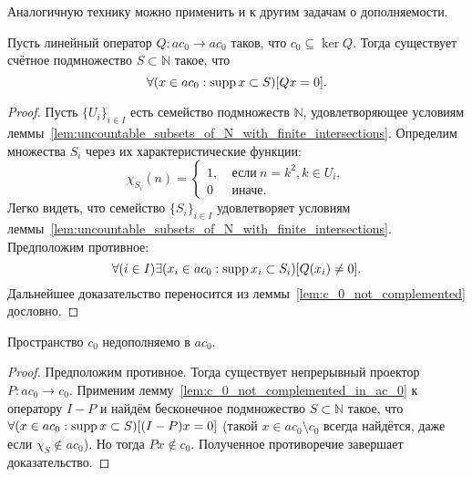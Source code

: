 Аналогичную технику можно применить и к другим задачам о дополняемости.




\begin{lemma}
	\label{lem:c_0_not_complemented_in_ac_0}
	Пусть линейный оператор $Q: ac_0 \to ac_0$ таков, что $c_0\subseteq \ker Q$.
	Тогда существует счётное подмножество $S \subset \mathbb{N}$ такое, что
	\begin{equation}
		\forall(x \in ac_0 : \operatorname{supp} x \subset S)[Qx = 0]
		.
	\end{equation}
\end{lemma}

\begin{proof}
	Пусть $\{U_i\}_{i \in I}$ есть семейство подмножеств $\mathbb{N}$,
	удовлетворяющее условиям леммы~\ref{lem:uncountable_subsets_of_N_with_finite_intersections}.
	Определим множества $S_i$ через их характеристические функции:
	\begin{equation}
		\chi_{S_i} (n) = \begin{cases}
			1, & ~\mbox{если}~ n = k^2, k\in U_i,
			\\
			0  & ~\mbox{иначе.}
		\end{cases}
	\end{equation}
	Легко видеть, что семейство $\{S_i\}_{i \in I}$ удовлетворяет условиям леммы~\ref{lem:uncountable_subsets_of_N_with_finite_intersections}.
	Предположим противное:
	\begin{equation}
		\forall(i\in I)\exists(x_i \in ac_0 : \operatorname{supp} x_i \subset S_i)[Q(x_i) \neq 0]
		.
	\end{equation}
	Дальнейшее доказательство переносится из леммы~\ref{lem:c_0_not_complemented} дословно.
\end{proof}

\begin{theorem}
	Пространство $c_0$ недополняемо в $ac_0$.
\end{theorem}


\begin{proof}
	Предположим противное.
	Тогда существует непрерывный проектор $P: ac_0 \to c_0$.
	Применим лемму~\ref{lem:c_0_not_complemented_in_ac_0} к оператору $I-P$
	и найдём бесконечное подмножество $S\subset\mathbb{N}$ такое,
	что $\forall(x\in ac_0 : \operatorname{supp} x \subset S)[(I-P)x = 0]$
	(такой $x \in ac_0 \setminus c_0$ всегда найдётся, даже если $\chi_S \notin ac_0$).
	Но тогда $Px\notin c_0$.
	Полученное противоречие завершает доказательство.
\end{proof}


